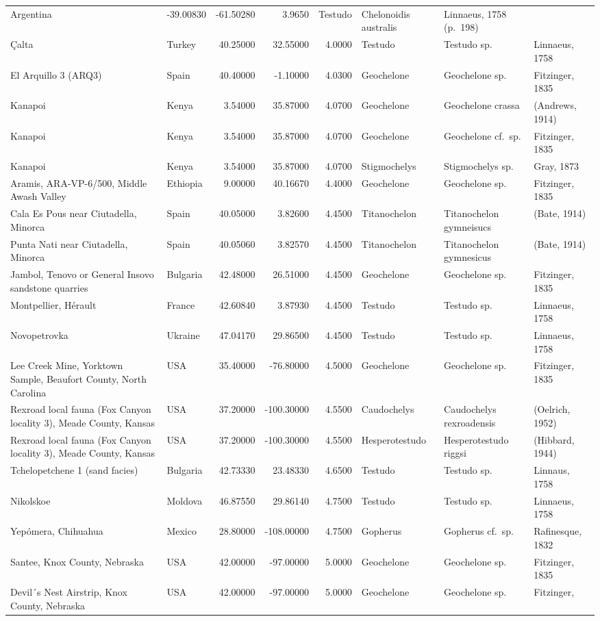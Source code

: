 \documentclass[]{article}
\begin{document}
\begin{longtable}[]{@{}llrrrlll@{}}
Argentina & -39.00830 & -61.50280 & 3.9650 & Testudo & Chelonoidis
australis & Linnaeus, 1758 (p.~198)\tabularnewline
Çalta & Turkey & 40.25000 & 32.55000 & 4.0000 & Testudo & Testudo sp. &
Linnaeus, 1758\tabularnewline
El Arquillo 3 (ARQ3) & Spain & 40.40000 & -1.10000 & 4.0300 & Geochelone
& Geochelone sp. & Fitzinger, 1835\tabularnewline
Kanapoi & Kenya & 3.54000 & 35.87000 & 4.0700 & Geochelone & Geochelone
crassa & (Andrews, 1914)\tabularnewline
Kanapoi & Kenya & 3.54000 & 35.87000 & 4.0700 & Geochelone & Geochelone
cf.~sp. & Fitzinger, 1835\tabularnewline
Kanapoi & Kenya & 3.54000 & 35.87000 & 4.0700 & Stigmochelys &
Stigmochelys sp. & Gray, 1873\tabularnewline
Aramis, ARA-VP-6/500, Middle Awash Valley & Ethiopia & 9.00000 &
40.16670 & 4.4000 & Geochelone & Geochelone sp. & Fitzinger,
1835\tabularnewline
Cala Es Pous near Ciutadella, Minorca & Spain & 40.05000 & 3.82600 &
4.4500 & Titanochelon & Titanochelon gymneisucs & (Bate,
1914)\tabularnewline
Punta Nati near Ciutadella, Minorca & Spain & 40.05060 & 3.82570 &
4.4500 & Titanochelon & Titanochelon gymnesicus & (Bate,
1914)\tabularnewline
Jambol, Tenovo or General Insovo sandstone quarries & Bulgaria &
42.48000 & 26.51000 & 4.4500 & Geochelone & Geochelone sp. & Fitzinger,
1835\tabularnewline
Montpellier, Hérault & France & 42.60840 & 3.87930 & 4.4500 & Testudo &
Testudo sp. & Linnaeus, 1758\tabularnewline
Novopetrovka & Ukraine & 47.04170 & 29.86500 & 4.4500 & Testudo &
Testudo sp. & Linnaeus, 1758\tabularnewline
Lee Creek Mine, Yorktown Sample, Beaufort County, North Carolina & USA &
35.40000 & -76.80000 & 4.5000 & Geochelone & Geochelone sp. & Fitzinger,
1835\tabularnewline
Rexroad local fauna (Fox Canyon locality 3), Meade County, Kansas & USA
& 37.20000 & -100.30000 & 4.5500 & Caudochelys & Caudochelys
rexroadensis & (Oelrich, 1952)\tabularnewline
Rexroad local fauna (Fox Canyon locality 3), Meade County, Kansas & USA
& 37.20000 & -100.30000 & 4.5500 & Hesperotestudo & Hesperotestudo
riggsi & (Hibbard, 1944)\tabularnewline
Tchelopetchene 1 (sand facies) & Bulgaria & 42.73330 & 23.48330 & 4.6500
& Testudo & Testudo sp. & Linnaus, 1758\tabularnewline
Nikolskoe & Moldova & 46.87550 & 29.86140 & 4.7500 & Testudo & Testudo
sp. & Linnaeus, 1758\tabularnewline
Yepómera, Chihuahua & Mexico & 28.80000 & -108.00000 & 4.7500 & Gopherus
& Gopherus cf.~sp. & Rafinesque, 1832\tabularnewline
Santee, Knox County, Nebraska & USA & 42.00000 & -97.00000 & 5.0000 &
Geochelone & Geochelone sp. & Fitzinger, 1835\tabularnewline
Devil´s Nest Airstrip, Knox County, Nebraska & USA & 42.00000 &
-97.00000 & 5.0000 & Geochelone & Geochelone sp. & Fitzinger,

\end{longtable}
\end{document}
